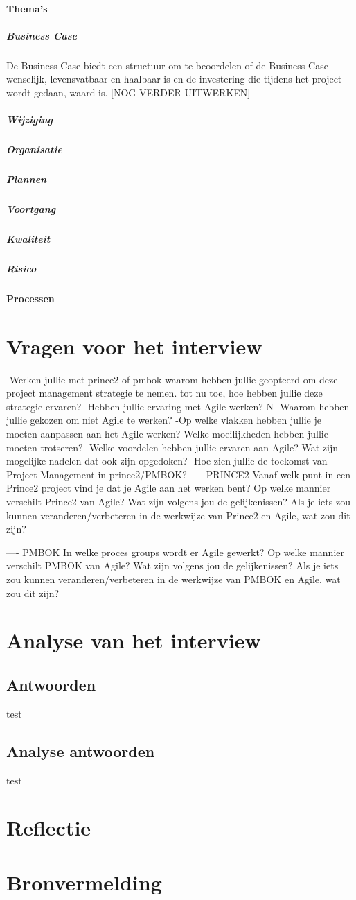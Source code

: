 \documentclass[]{article}
\begin{document}
\paragraph{Thema's}
\subparagraph{Business Case}
De Business Case biedt een structuur om te beoordelen of de Business Case wenselijk, levensvatbaar en haalbaar is en de investering die tijdens het project wordt gedaan, waard is. [NOG VERDER UITWERKEN]

\subparagraph{Wijziging}

\subparagraph{Organisatie}

\subparagraph{Plannen}

\subparagraph{Voortgang}

\subparagraph{Kwaliteit}

\subparagraph{Risico}

\paragraph{Processen}


\section{Vragen voor het interview}
-Werken jullie met prince2 of pmbok
	waarom hebben jullie geopteerd om deze project management strategie te nemen.
	tot nu toe, hoe hebben jullie deze strategie ervaren?
-Hebben jullie ervaring met Agile werken?
	N- Waarom hebben jullie gekozen om niet Agile te werken?
-Op welke vlakken hebben jullie je moeten aanpassen aan het Agile werken?
	Welke moeilijkheden hebben jullie moeten trotseren?
-Welke voordelen hebben jullie ervaren aan Agile?
	Wat zijn mogelijke nadelen dat ook zijn opgedoken?
-Hoe zien jullie de toekomst van Project Management in prince2/PMBOK?
----
PRINCE2
	Vanaf welk punt in een Prince2 project vind je dat je Agile aan het werken bent?
	Op welke mannier verschilt Prince2 van Agile?
		Wat zijn volgens jou de gelijkenissen?
	Als je iets zou kunnen veranderen/verbeteren in de werkwijze van Prince2 en Agile, wat zou dit zijn?
	
----
PMBOK
	In welke proces groups wordt er Agile gewerkt?
	Op welke mannier verschilt PMBOK van Agile?
	Wat zijn volgens jou de gelijkenissen?
	Als je iets zou kunnen veranderen/verbeteren in de werkwijze van PMBOK en Agile, wat zou dit zijn?

\section{Analyse van het interview}

\subsection{Antwoorden}
test
\subsection{Analyse antwoorden}
test

\section{Reflectie}

\section{Bronvermelding}
\printbibliography
\end{document}
